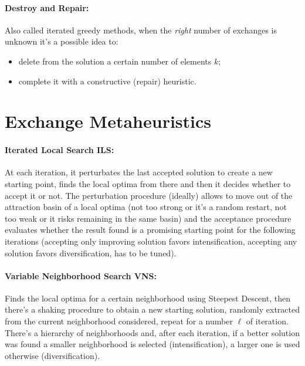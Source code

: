 \documentclass{article}
\begin{document}
	\paragraph{Destroy and Repair:} Also called iterated greedy methods, when the \textit{right} number of exchanges is unknown it's a possible idea to:
	\begin{itemize}
		\item delete from the solution a certain number of elements $k$;
		\item complete it with a constructive (repair) heuristic.\\
	\end{itemize}
	
	\section*{Exchange Metaheuristics}
	
	\paragraph{Iterated Local Search ILS:} At each iteration, it perturbates the last accepted solution to create a new starting point, finds the local optima from there and then it decides whether to accept it or not. The perturbation procedure (ideally) allows to move out of the attraction basin of a local optima (not too strong or it's a random restart, not too weak or it risks remaining in the same basin) and the acceptance procedure evaluates whether the result found is a promising starting point for the following iterations (accepting only improving solution favors intensification, accepting any solution favors diversification, has to be tuned). \\
	
	\paragraph{Variable Neighborhood Search VNS:} Finds the local optima for a certain neighborhood using Steepest Descent, then there's a shaking procedure to obtain a new starting solution, randomly extracted from the current neighborhood considered, repeat for a number $\ell$ of iteration. There's a hierarchy of neighborhoods and, after each iteration, if a better solution was found a smaller neighborhood is selected (intensification), a larger one is used otherwise (diversification).\\
	
\end{document}
